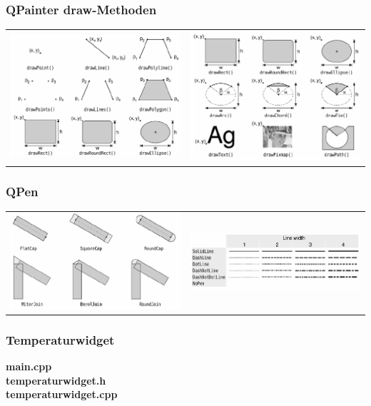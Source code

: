 \subsubsection{QPainter draw-Methoden}
\begin{tabular}{c c} %
	\includegraphics[width=9cm]{images/draw_1.png}& \includegraphics[width=9cm]{images/draw_2.png}\\
\end{tabular}
\subsubsection{QPen}
\begin{tabular}{c c}
	\includegraphics[width=9cm]{images/pen_1.png}& \includegraphics[width=9cm]{images/pen_2.png}\\
\end{tabular}
\newpage
\subsubsection{Temperaturwidget}
\textbf{main.cpp}
\\

\textbf{temperaturwidget.h}
\\

\newpage
\textbf{temperaturwidget.cpp}
